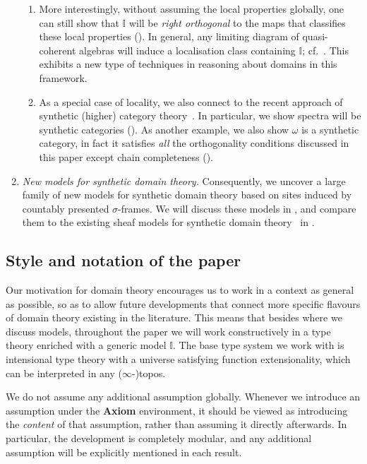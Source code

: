\documentclass[a4paper,12pt]{amsart}
\theoremstyle{definition}
\newcommand{\mbb}[1]{\mathbb{#1}}
\newcommand{\I}{\mbb I}
\begin{document}
\begin{enumerate}[leftmargin=*]
\begin{enumerate}
    \item  More interestingly, without assuming the local properties globally, one can still show that $\I$ will be \emph{right orthogonal} to the maps that classifies these local properties (). In general, any limiting diagram of quasi-coherent algebras will induce a localisation class containing $\I$; cf.\ . This exhibits a new type of techniques in reasoning about domains in this framework.
    
    \item As a special case of locality, we also connect to the recent approach of synthetic (higher) category theory~\citep{riehl2017type,buchholtz2021synthetic,gratzer2024directed}. In particular, we show spectra will be synthetic categories (). As another example, we also show $\omega$ is a synthetic category, in fact it satisfies \emph{all} the orthogonality conditions discussed in this paper except chain completeness ().
  \end{enumerate}

  \item \emph{New models for synthetic domain theory.} Consequently, we uncover a large family of new models for synthetic domain theory based on sites induced by countably presented $\sigma$-frames. We will discuss these models in , and compare them to the existing sheaf models for synthetic domain theory~\citep{FIORE1997151} in .
\end{enumerate}


\subsection{Style and notation of the paper}

Our motivation for domain theory encourages us to work in a context as general as possible, so as to allow future developments that connect more specific flavours of domain theory existing in the literature. This means that besides  where we discuss models, throughout the paper we will work constructively in a type theory enriched with a generic model $\I$. The base type system we work with is intensional type theory with a universe satisfying function extensionality, which can be interpreted in any ($\infty$-)topos. 

We do not assume any additional assumption globally. Whenever we introduce an assumption under the \textbf{Axiom} environment, it should be viewed as introducing the \emph{content} of that assumption, rather than assuming it directly afterwards. In particular, the development is completely modular, and any additional assumption will be explicitly mentioned in each result.
\end{document}
